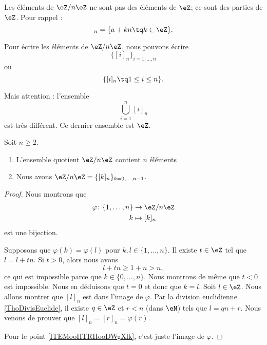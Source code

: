 \begin{normaltext}
	Les éléments de \( \eZ/n\eZ\) ne sont pas des éléments de \( \eZ\); ce sont des parties de \( \eZ\). Pour rappel :
	\begin{equation}
		[a]_n=\{ a+kn \tq k\in \eZ \}.
	\end{equation}

	Pour écrire les éléments de \( \eZ/n\eZ\), nous pouvons écrire
	\begin{equation}
		\{ [i]_n \}_{i=1,\ldots, n}
	\end{equation}
	ou
	\begin{equation}
		\{ [i]_n\tq 1\leq i\leq n \}.
	\end{equation}

	Mais attention : l'ensemble
	\begin{equation}
		\bigcup_{i=1}^n[i]_n
	\end{equation}
	est très différent. Ce dernier ensemble est \( \eZ\).
\end{normaltext}

\begin{proposition}   \label{PROPooEWREooUOSMsE}
	Soit \( n\geq 2\).
	\begin{enumerate}
		\item
		      L'ensemble quotient \( \eZ/n\eZ\) contient \( n\) éléments
		\item		\label{ITEMooHTRHooDWgXlk}
		      Nous avons \( \eZ/n\eZ=\{ [k]_n \}_{k=0,\ldots, n-1}\).
	\end{enumerate}
\end{proposition}

\begin{proof}
	Nous montrons que
	\begin{equation}
		\begin{aligned}
			\varphi\colon \{ 1,\ldots,n \} & \to \eZ/n\eZ  \\
			k                              & \mapsto [k]_n
		\end{aligned}
	\end{equation}
	est une bijection.

	\begin{subproof}
		\spitem[Injective]
		Supposons que \( \varphi(k)=\varphi(l)\) pour \( k,l\in \{ 1,\ldots,n \}\). Il existe \( t\in \eZ\) tel que \( l=l+tn\). Si \( t>0\), alors nous avons
		\begin{equation}
			l+tn\geq 1+n>n,
		\end{equation}
		ce qui est impossible parce que \( k\in\{ 0,\ldots,n \}\). Nous montrons de même que \( t<0\) est impossible. Nous en déduisons que \( t=0\) et donc que \( k=l\).
		\spitem[Surjective]
		Soit \( l\in \eZ\). Nous allons montrer que \( [l]_n\) est dans l'image de \( \varphi\). Par la division euclidienne \ref{ThoDivisEuclide}, il existe \( q\in \eZ\) et \( r<n\) (dans \( \eN\)) tels que \( l=qn+r\). Nous venons de prouver que \( [l]_n=[r]_n=\varphi(r)\).
	\end{subproof}
	Pour le point \ref{ITEMooHTRHooDWgXlk}, c'est juste l'image de \( \varphi\).
\end{proof}


